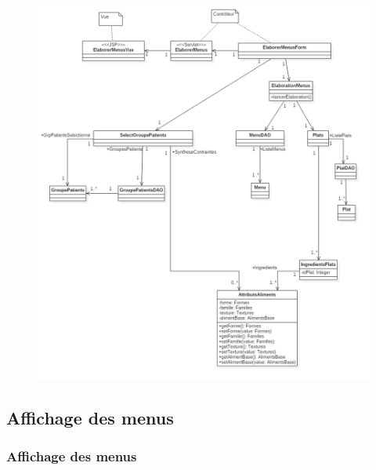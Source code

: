 \documentclass{beamer}
\begin{document}
\begin{frame}[plain]{}
\begin{figure}
\centering
\includegraphics[scale=0.250]{../CasDUtilisations/MenuGen/Classes/EMC.png}
\end{figure}
\end{frame}

\subsection{Affichage des menus}
\begin{frame}
\frametitle{Affichage des menus}

\end{frame}
\end{document}
